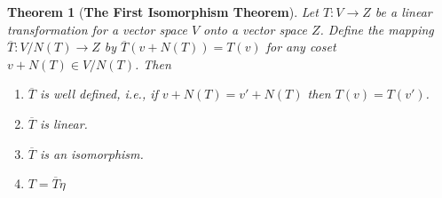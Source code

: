 \documentclass[12pt, a4paper]{article}
\newtheorem{theorem}{Theorem}[section]
\theoremstyle{definition}
\theoremstyle{remark}
\begin{document}
\begin{theorem}[\textbf{The First Isomorphism Theorem}]
    Let $T: V \to Z$ be a linear transformation for a vector space $V$ onto a vector space $Z$. Define the mapping $\overline{T}:V/N(T) \to Z$ by $\overline{T}(v+N(T))=T(v)$ for any coset $v+N(T) \in V/N(T)$. Then
    \begin{enumerate}
        \item $\overline{T}$ is well defined, \textit{i.e.}, if $v+N(T) = v'+N(T)$ then $T(v)=T(v')$.
        \item $\overline{T}$ is linear.
        \item $\overline{T}$ is an isomorphism.
        \item $T = \overline{T}\eta$
    \end{enumerate}
    \begin{figure}[h]
        \centering
    \end{figure}
\end{theorem}
\end{document}
